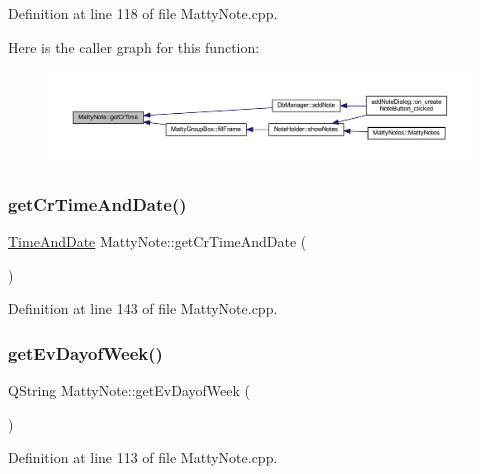 Definition at line 118 of file Matty\+Note.\+cpp.

Here is the caller graph for this function\+:
\nopagebreak
\begin{figure}[H]
\begin{center}
\leavevmode
\includegraphics[width=350pt]{classMattyNote_a2acf19aded7d4b5c29db7af6b0c4b1f6_icgraph}
\end{center}
\end{figure}
\hypertarget{classMattyNote_aff50eb125d7a0a64ac3fb21f056ec745}{}\label{classMattyNote_aff50eb125d7a0a64ac3fb21f056ec745} 
\subsubsection{\texorpdfstring{get\+Cr\+Time\+And\+Date()}{getCrTimeAndDate()}}
{\footnotesize\ttfamily \hyperlink{structTimeAndDate}{Time\+And\+Date} Matty\+Note\+::get\+Cr\+Time\+And\+Date (\begin{DoxyParamCaption}{ }\end{DoxyParamCaption})}



Definition at line 143 of file Matty\+Note.\+cpp.

\hypertarget{classMattyNote_ac6f675c525f027536fdcfda43f0a261e}{}\label{classMattyNote_ac6f675c525f027536fdcfda43f0a261e} 
\subsubsection{\texorpdfstring{get\+Ev\+Dayof\+Week()}{getEvDayofWeek()}}
{\footnotesize\ttfamily Q\+String Matty\+Note\+::get\+Ev\+Dayof\+Week (\begin{DoxyParamCaption}{ }\end{DoxyParamCaption})}



Definition at line 113 of file Matty\+Note.\+cpp.

